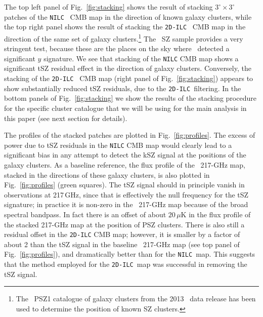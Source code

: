 \documentclass[traditabstract, longauth]{aa}
\newcommand{\nilc}{{\tt NILC}}
\newcommand{\twodilc}{{\tt 2D-ILC}}
\newcommand{\1}{\'\i }
\begin{document}
The top left panel of Fig.~\ref{fig:stacking} shows the result of stacking
$3^\circ \times 3^\circ$ patches of the {\tt NILC} \Planck\ CMB map in the
direction of known galaxy clusters, while the top right panel shows the result
of stacking the {\tt 2D-ILC} \Planck\ CMB map in the direction of the same
set of galaxy clusters.\footnote{The \Planck\ PSZ1 catalogue of galaxy
clusters from the 2013 \Planck\ data release has been used to determine the
position of known SZ clusters.} The \Planck\ SZ sample provides a very stringent
test, because these are the places on the sky where \Planck\ detected a
significant $y$ signature.  We see that stacking of the {\tt NILC} CMB map
shows a significant tSZ residual effect in the
direction of galaxy clusters. Conversely, the stacking of the {\tt 2D-ILC}
\Planck\ CMB map (right panel of Fig.~\ref{fig:stacking}) appears to show
substantially reduced tSZ residuals, due to the \twodilc\ filtering.  In the
bottom panels of Fig.~\ref{fig:stacking} we show the results of the stacking
procedure for the specific cluster catalogue that we will be using for the
main analysis in this paper (see next section for details).

The profiles
of the stacked patches are plotted in Fig.~\ref{fig:profiles}. The excess of
power due to tSZ residuals in the {\tt NILC} CMB map would clearly lead to a
significant bias in any attempt to detect the kSZ signal at the positions of
the galaxy clusters. As a baseline reference, the flux profile of the
\Planck\ 217-GHz map, stacked in the directions of these galaxy
clusters, is also plotted in Fig.~\ref{fig:profiles} (green squares). The tSZ
signal should in principle vanish in observations at 217\,GHz, since that is
effectively the null frequency for the tSZ signature;
in practice it is non-zero in the
\Planck\ 217-GHz map because of the broad spectral bandpass. In fact there
is an offset of about $20\,\mu$K in the flux profile of the stacked 217-GHz
map at the position of PSZ clusters. There is also still a residual offset in the {\tt 2D-ILC} CMB map; however,
it is smaller by a factor of about 2 than the tSZ signal in the baseline
\Planck\ 217-GHz map (see top panel of Fig.~\ref{fig:profiles}), and dramatically
better than for the \nilc\ map. This suggests that the method employed for the
\twodilc\ map was successful in removing the tSZ signal.
\end{document}
